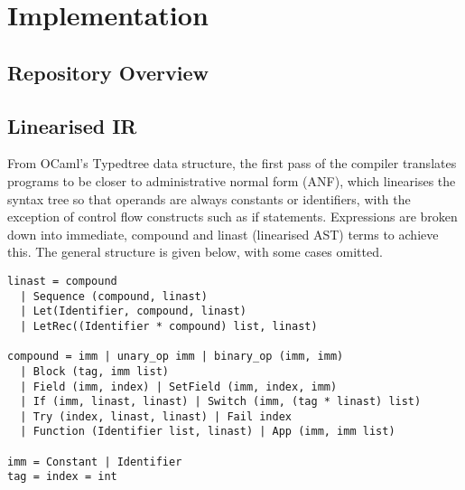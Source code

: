\chapter{Implementation}

\section{Repository Overview}

\section{Linearised IR}
From OCaml's Typedtree data structure, the first pass of the compiler translates programs to be closer to administrative normal form (ANF), which linearises the syntax tree so that operands are always constants or identifiers, with the exception of control flow constructs such as if statements. Expressions are broken down into immediate, compound and linast (linearised AST) terms to achieve this. The general structure is given below, with some cases omitted.

\begin{verbatim}
linast = compound 
  | Sequence (compound, linast)
  | Let(Identifier, compound, linast) 
  | LetRec((Identifier * compound) list, linast)

compound = imm | unary_op imm | binary_op (imm, imm) 
  | Block (tag, imm list)
  | Field (imm, index) | SetField (imm, index, imm)
  | If (imm, linast, linast) | Switch (imm, (tag * linast) list)
  | Try (index, linast, linast) | Fail index
  | Function (Identifier list, linast) | App (imm, imm list)

imm = Constant | Identifier
tag = index = int
\end{verbatim}

%

